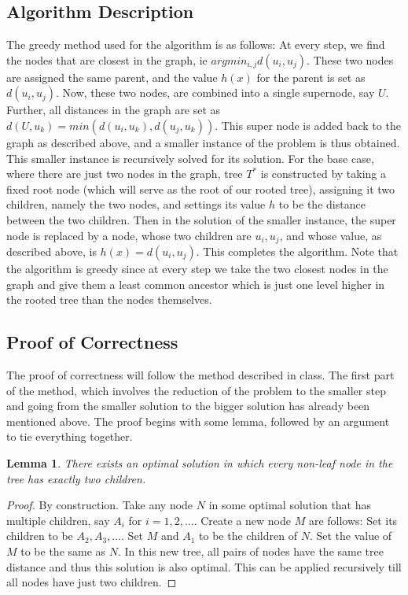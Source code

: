 \documentclass{article}
\newtheorem{lemma}{Lemma}
\begin{document}
\subsection{Algorithm Description}
The greedy method used for the algorithm is as follows:
At every step, we find the nodes that are closest in the graph, ie $argmin_{i, j} d(u_{i}, u_{j})$.
These two nodes are assigned the same parent, and the value $h(x)$ for the parent is set as $d(u_{i}, u_{j})$.
Now, these two nodes, are combined into a single supernode, say $U$.
Further, all distances in the graph are set as $d(U, u_{k}) = min(d(u_{i}, u_{k}), d(u_{j}, u_{k}))$.
This super node is added back to the graph as described above, and a smaller instance of the problem is thus obtained.
This smaller instance is recursively solved for its solution.
For the base case, where there are just two nodes in the graph, tree $T^{*}$ is constructed by taking a fixed root node (which will serve as the root of our rooted tree), assigning it two children, namely the two nodes, and settings its value $h$ to be the distance between the two children.
Then in the solution of the smaller instance, the super node is replaced by a node, whose two children are $u_{i}, u_{j}$, and whose value, as described above, is $h(x) = d(u_{i}, u_{j})$.
This completes the algorithm.
Note that the algorithm is greedy since at every step we take the two closest nodes in the graph and give them a least common ancestor which is just one level higher in the rooted tree than the nodes themselves.

\subsection{Proof of Correctness}
The proof of correctness will follow the method described in class.
The first part of the method, which involves the reduction of the problem to the smaller step and going from the smaller solution to the bigger solution has already been mentioned above.
The proof begins with some lemma, followed by an argument to tie everything together.
\begin{lemma}
	There exists an optimal solution in which every non-leaf node in the tree has exactly two children.
\end{lemma}
\begin{proof}
	By construction. Take any node $N$ in some optimal solution that has multiple children, say $A_{i}$ for $i = 1, 2, \dots$.
	Create a new node $M$ are follows: Set its children to be $A_{2}, A_{3}, \dots$.
	Set $M$ and $A_{1}$ to be the children of $N$.
	Set the value of $M$ to be the same as $N$.
	In this new tree, all pairs of nodes have the same tree distance and thus this solution is also optimal.
	This can be applied recursively till all nodes have just two children.
\end{proof}
\end{document}
